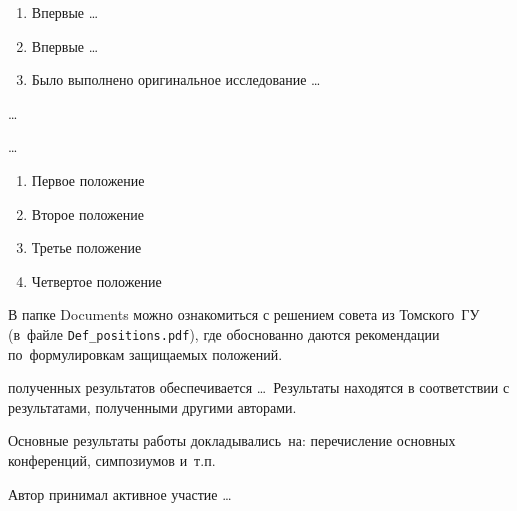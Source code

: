 {\novelty}
\begin{enumerate}[beginpenalty=10000] %
  \item Впервые \ldots
  \item Впервые \ldots
  \item Было выполнено оригинальное исследование \ldots
\end{enumerate}

{\influence} \ldots

{\methods} \ldots

{}
\begin{enumerate}[beginpenalty=10000] %
  \item Первое положение
  \item Второе положение
  \item Третье положение
  \item Четвертое положение
\end{enumerate}
В папке Documents можно ознакомиться с решением совета из Томского~ГУ
(в~файле \verb+Def_positions.pdf+), где обоснованно даются рекомендации
по~формулировкам защищаемых положений.

{\reliability} полученных результатов обеспечивается \ldots \ Результаты находятся в соответствии с результатами, полученными другими авторами.


{\probation}
Основные результаты работы докладывались~на:
перечисление основных конференций, симпозиумов и~т.\:п.

{\contribution} Автор принимал активное участие \ldots

